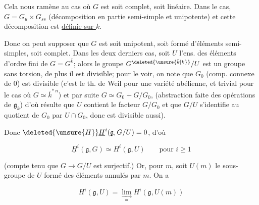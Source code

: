 
Cela nous ramène au cas où $G$ est soit complet, soit linéaire. Dans le   cas,  $G=G_u\times G_{ss}$ (décomposition en partie semi-simple et unipotente) et cette décomposition est \uline{définie sur $k$}.


Donc on peut supposer que $G$ est soit unipotent, soit  formé d'éléments semi-simples, soit complet. Dans les deux derniers cas, soit $U$ l'ens. des éléments d'ordre fini de $G=G^{\bar k}$; alors le groupe $G^{\deleted{\unsure{\bar k|k}}}/U$ est un groupe sans torsion, de plus il est divisible; pour le voir, on note que $G_0$ (comp. connexe de $0$) est divisible (c'est le th. de Weil pour une variété abélienne, et  trivial pour le cas où $G\simeq\bar k^{*\,n}$) et  par suite $G\simeq G_0+G/G_0$,  (abstraction faite des opérations de $\mathfrak g_k$) d'où résulte que $U$ contient le facteur $G/G_0$ et que $G/U$ s'identifie au  quotient de $G_0$ par $U\cap G_0$, donc est divisible aussi).


Donc $\deleted{\unsure{H}}\underline{H}^i(\mathfrak g,G/U)=0$,   d'où

\[\underline{H}^i(\mathfrak g,G)\simeq H^i(\mathfrak g,U)\qquad\text{pour }i\geq1\]


(compte tenu que $G\longrightarrow G/U$ est surjectif.) Or, pour  $m$, soit $U(m)$ le sous-groupe de $U$ formé des éléments annulés par $m$. On a

\[H^i(\mathfrak g,U)=\lim_{\underset m\longrightarrow} H^i(\mathfrak g,U(m))\]


